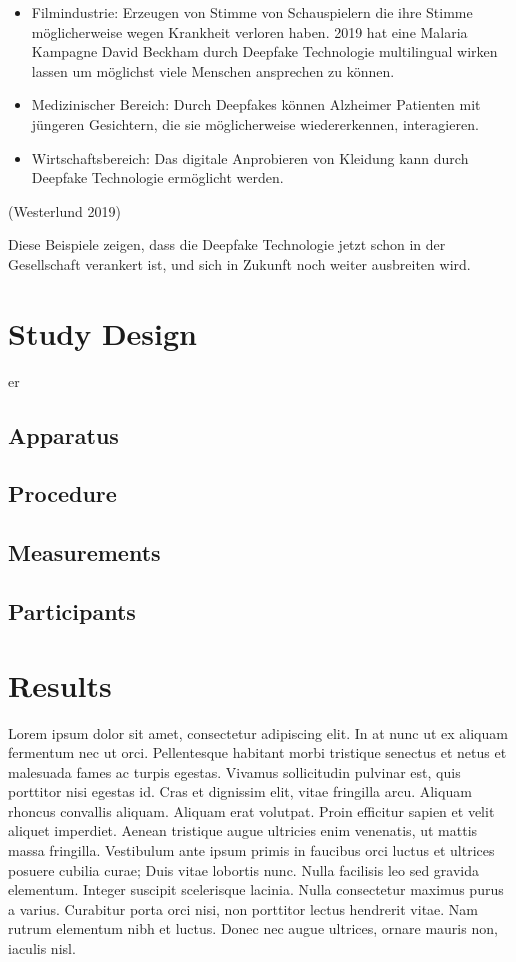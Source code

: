 \begin{itemize}
    \item Filmindustrie: Erzeugen von Stimme von Schauspielern die ihre Stimme möglicherweise wegen Krankheit verloren haben. 2019 hat eine Malaria Kampagne David Beckham durch Deepfake Technologie multilingual wirken lassen um möglichst viele Menschen ansprechen zu können.
    \item Medizinischer Bereich: Durch Deepfakes können Alzheimer Patienten mit jüngeren Gesichtern, die sie möglicherweise wiedererkennen, interagieren. 
    \item Wirtschaftsbereich: Das digitale Anprobieren von Kleidung kann durch Deepfake Technologie ermöglicht werden.
\end{itemize}
(Westerlund 2019)

Diese Beispiele zeigen, dass die Deepfake Technologie jetzt schon in der Gesellschaft verankert ist, und sich in Zukunft noch weiter ausbreiten wird.
\chapter{Study Design}

\gls{er}

\section{Apparatus}

\section{Procedure}

\section{Measurements}

\section{Participants}

\chapter{Results}

Lorem ipsum dolor sit amet, consectetur adipiscing elit. In at nunc ut ex aliquam fermentum nec ut orci. Pellentesque habitant morbi tristique senectus et netus et malesuada fames ac turpis egestas. Vivamus sollicitudin pulvinar est, quis porttitor nisi egestas id. Cras et dignissim elit, vitae fringilla arcu. Aliquam rhoncus convallis aliquam. Aliquam erat volutpat. Proin efficitur sapien et velit aliquet imperdiet. Aenean tristique augue ultricies enim venenatis, ut mattis massa fringilla. Vestibulum ante ipsum primis in faucibus orci luctus et ultrices posuere cubilia curae; Duis vitae lobortis nunc. Nulla facilisis leo sed gravida elementum. Integer suscipit scelerisque lacinia. Nulla consectetur maximus purus a varius. Curabitur porta orci nisi, non porttitor lectus hendrerit vitae. Nam rutrum elementum nibh et luctus. Donec nec augue ultrices, ornare mauris non, iaculis nisl.

